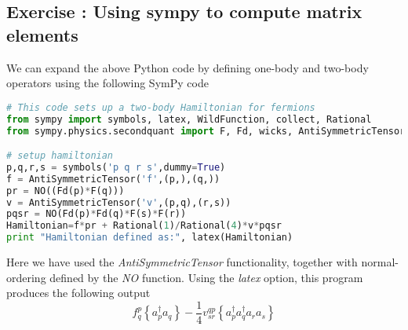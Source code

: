 \documentclass[graybox,sectrefs,envcountresetchap,open=right]{svmonodo}
\newenvironment{doconceexercise}{}{}
\newcounter{doconceexercisecounter}
\begin{document}
\begin{doconceexercise}

\subsection*{Exercise \thedoconceexercisecounter: Using sympy to compute matrix elements}


We can expand the above Python code by defining one-body and two-body operators using  the following SymPy code 
\begin{lstlisting}[language=Python,style=blue1bar]
# This code sets up a two-body Hamiltonian for fermions
from sympy import symbols, latex, WildFunction, collect, Rational
from sympy.physics.secondquant import F, Fd, wicks, AntiSymmetricTensor, substitute_dummies, NO

# setup hamiltonian
p,q,r,s = symbols('p q r s',dummy=True)
f = AntiSymmetricTensor('f',(p,),(q,))
pr = NO((Fd(p)*F(q)))
v = AntiSymmetricTensor('v',(p,q),(r,s))
pqsr = NO(Fd(p)*Fd(q)*F(s)*F(r))
Hamiltonian=f*pr + Rational(1)/Rational(4)*v*pqsr
print "Hamiltonian defined as:", latex(Hamiltonian)
\end{lstlisting}
Here we have used the \emph{AntiSymmetricTensor} functionality, together with normal-ordering defined by the \emph{NO} function. 
Using the \emph{latex} option, this program produces the following output
\[
f^{p}_{q} \left\{a^\dagger_{p} a_{q}\right\} - \frac{1}{4} v^{qp}_{sr} \left\{a^\dagger_{p} a^\dagger_{q} a_{r} a_{s}\right\}
\]

\end{doconceexercise}
\end{document}
